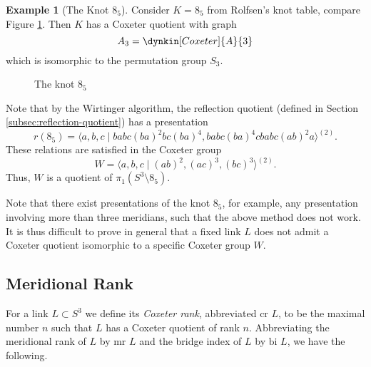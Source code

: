 \documentclass{article}
\theoremstyle{definition}
\newtheorem{example}[theorem]{Example}
\begin{document}
\begin{example}[The Knot $8_5$]
Consider $K = 8_5$ from Rolfsen's knot table, compare Figure \ref{fig:8-5}. Then $K$ has a Coxeter quotient with graph $$A_3 = \dynkin[Coxeter]{A}{3}$$ which is isomorphic to the permutation group $S_3$.

\begin{figure}[ht]
\centering
{}
\caption{The knot $8_5$}
\label{fig:8-5}
\end{figure}

Note that by the Wirtinger algorithm, the reflection quotient (defined in Section \ref{subsec:reflection-quotient}) has a presentation
$$r(8_5) = \langle a, b, c\; | \; babc(ba)^2bc(ba)^4, babc(ba)^4cbabc(ab)^2a \rangle^{(2)}.$$
These relations are satisfied in the Coxeter group
$$W = \langle a, b, c \; | \; (ab)^2, (ac)^3, (bc)^3 \rangle^{(2)}.$$
Thus, $W$ is a quotient of $\pi_1(S^3 \setminus 8_5)$.
\end{example}

Note that there exist presentations of the knot $8_5$, for example, any presentation involving more than three meridians, such that the above method does not work. It is thus difficult to prove in general that a fixed link $L$ does not admit a Coxeter quotient isomorphic to a specific Coxeter group $W$.

\subsection{Meridional Rank}
For a link $L \subset S^3$ we define its \textit{Coxeter rank}, abbreviated $\text{cr } L$, to be the maximal number $n$ such that $L$ has a Coxeter quotient of rank $n$. Abbreviating the meridional rank of $L$ by $\text{mr }L$ and the bridge index of $L$ by $\text{bi } L$, we have the following.
\end{document}

